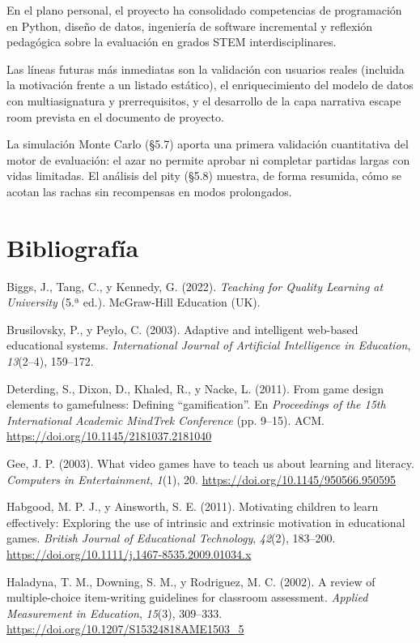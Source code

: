 \documentclass[11pt,a4paper]{article}
\begin{document}
En el plano personal, el proyecto ha consolidado competencias de programación en Python, diseño de datos, ingeniería de software incremental y reflexión pedagógica sobre la evaluación en grados STEM interdisciplinares.

Las líneas futuras más inmediatas son la validación con usuarios reales (incluida la motivación frente a un listado estático), el enriquecimiento del modelo de datos con multiasignatura y prerrequisitos, y el desarrollo de la capa narrativa escape room prevista en el documento de proyecto.

La simulación Monte Carlo (§5.7) aporta una primera validación cuantitativa del motor de evaluación: el azar no permite aprobar ni completar partidas largas con vidas limitadas. El análisis del pity (§5.8) muestra, de forma resumida, cómo se acotan las rachas sin recompensas en modos prolongados.

\section{Bibliografía}

Biggs, J., Tang, C., y Kennedy, G. (2022). \textit{Teaching for Quality Learning at University} (5.ª ed.). McGraw-Hill Education (UK).

Brusilovsky, P., y Peylo, C. (2003). Adaptive and intelligent web-based educational systems. \textit{International Journal of Artificial Intelligence in Education}, \textit{13}(2--4), 159--172.

Deterding, S., Dixon, D., Khaled, R., y Nacke, L. (2011). From game design elements to gamefulness: Defining ``gamification''. En \textit{Proceedings of the 15th International Academic MindTrek Conference} (pp. 9--15). ACM. \url{https://doi.org/10.1145/2181037.2181040}

Gee, J. P. (2003). What video games have to teach us about learning and literacy. \textit{Computers in Entertainment}, \textit{1}(1), 20. \url{https://doi.org/10.1145/950566.950595}

Habgood, M. P. J., y Ainsworth, S. E. (2011). Motivating children to learn effectively: Exploring the use of intrinsic and extrinsic motivation in educational games. \textit{British Journal of Educational Technology}, \textit{42}(2), 183--200. \url{https://doi.org/10.1111/j.1467-8535.2009.01034.x}

Haladyna, T. M., Downing, S. M., y Rodriguez, M. C. (2002). A review of multiple-choice item-writing guidelines for classroom assessment. \textit{Applied Measurement in Education}, \textit{15}(3), 309--333. \url{https://doi.org/10.1207/S15324818AME1503_5}
\end{document}
